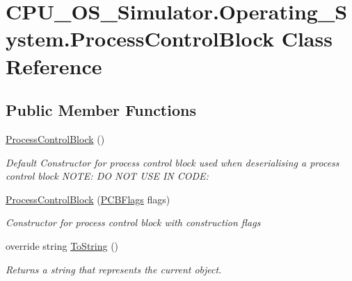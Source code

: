 \hypertarget{class_c_p_u___o_s___simulator_1_1_operating___system_1_1_process_control_block}{}\section{C\+P\+U\+\_\+\+O\+S\+\_\+\+Simulator.\+Operating\+\_\+\+System.\+Process\+Control\+Block Class Reference}
\label{class_c_p_u___o_s___simulator_1_1_operating___system_1_1_process_control_block}
\subsection*{Public Member Functions}
\begin{DoxyCompactItemize}
\item 
\hyperlink{class_c_p_u___o_s___simulator_1_1_operating___system_1_1_process_control_block_a8af7f052d1a03e35f7298407df2055e7}{Process\+Control\+Block} ()
\begin{DoxyCompactList}\small\item\em Default Constructor for process control block used when deserialising a process control block N\+O\+T\+E\+: D\+O N\+O\+T U\+S\+E I\+N C\+O\+D\+E\+: \end{DoxyCompactList}\item 
\hyperlink{class_c_p_u___o_s___simulator_1_1_operating___system_1_1_process_control_block_a95c13984ceebe2b73b0cd48b82361179}{Process\+Control\+Block} (\hyperlink{struct_c_p_u___o_s___simulator_1_1_operating___system_1_1_p_c_b_flags}{P\+C\+B\+Flags} flags)
\begin{DoxyCompactList}\small\item\em Constructor for process control block with construction flags \end{DoxyCompactList}\item 
override string \hyperlink{class_c_p_u___o_s___simulator_1_1_operating___system_1_1_process_control_block_ac1559146d5dd5b86333a16fb2256f256}{To\+String} ()
\begin{DoxyCompactList}\small\item\em Returns a string that represents the current object. \end{DoxyCompactList}\end{DoxyCompactItemize}
